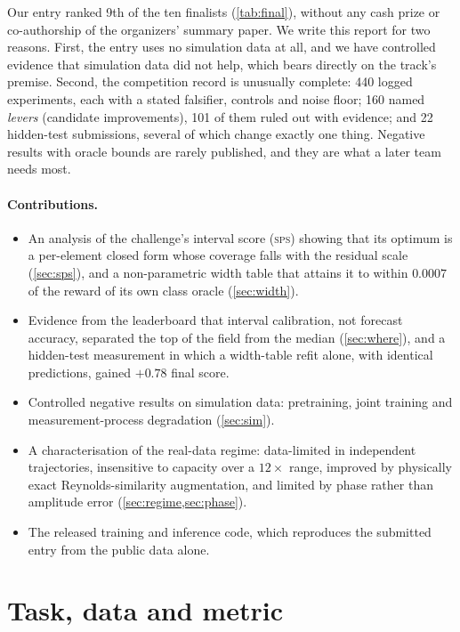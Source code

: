 \documentclass[10pt]{article}
\newcommand{\sps}{\textsc{sps}}
\begin{document}
Our entry ranked 9th of the ten finalists (\cref{tab:final}), without any cash prize or co-authorship of the organizers' summary paper. We write this report for two reasons. First, the entry uses no simulation data at all, and we have controlled evidence that simulation data did not help, which bears directly on the track's premise. Second, the competition record is unusually complete: 440 logged experiments, each with a stated falsifier, controls and noise floor; 160 named \emph{levers} (candidate improvements), 101 of them ruled out with evidence; and 22 hidden-test submissions, several of which change exactly one thing. Negative results with oracle bounds are rarely published, and they are what a later team needs most.

\paragraph{Contributions.}
\begin{itemize}
\item An analysis of the challenge's interval score (\sps{}) showing that its optimum is a per-element closed form whose coverage falls with the residual scale (\cref{sec:sps}), and a non-parametric width table that attains it to within $0.0007$ of the reward of its own class oracle (\cref{sec:width}).
\item Evidence from the leaderboard that interval calibration, not forecast accuracy, separated the top of the field from the median (\cref{sec:where}), and a hidden-test measurement in which a width-table refit alone, with identical predictions, gained $+0.78$ final score.
\item Controlled negative results on simulation data: pretraining, joint training and measurement-process degradation (\cref{sec:sim}).
\item A characterisation of the real-data regime: data-limited in independent trajectories, insensitive to capacity over a $12\times$ range, improved by physically exact Reynolds-similarity augmentation, and limited by phase rather than amplitude error (\cref{sec:regime,sec:phase}).
\item The released training and inference code, which reproduces the submitted entry from the public data alone.
\end{itemize}

\section{Task, data and metric}
\label{sec:task}
\end{document}

